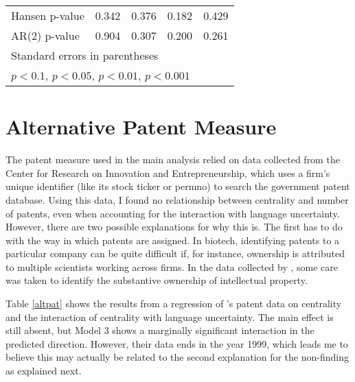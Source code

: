 \begin{table}
\begin{center}
{\begin{tabular}{l*{4}{c}}
Hansen p-value             &       0.342         &       0.376         &       0.182         &       0.429         \\
AR(2) p-value                &       0.904         &       0.307         &       0.200         &       0.261         \\
\hline\hline
\multicolumn{5}{l}{\footnotesize Standard errors in parentheses}\\
\multicolumn{5}{l}{\footnotesize \sym{+} \(p<0.1\), \sym{*} \(p<0.05\), \sym{**} \(p<0.01\), \sym{***} \(p<0.001\)}\\
\end{tabular}
}

\end{center}
\end{table}

\section{Alternative Patent Measure}

The patent measure used in the main analysis relied on data collected from the Center for Research on Innovation and Entrepreneurship, which uses a firm's unique identifier (like its stock ticker or permno) to search the government patent database. Using this data, I found no relationship between centrality and number of patents, even when accounting for the interaction with language uncertainty. However, there are two possible explanations for why this is. The first has to do with the way in which patents are assigned. In biotech, identifying patents to a particular company can be quite difficult if, for instance, ownership is attributed to multiple scientists working across firms. In the data collected by \citet{powell1999}, some care was taken to identify the substantive ownership of intellectual property.

Table \ref{altpat} shows the results from a regression of \citet{powell1999}'s patent data on centrality and the interaction of centrality with language uncertainty. The main effect is still absent, but Model 3 shows a marginally significant interaction in the predicted direction. However, their data ends in the year 1999, which leads me to believe this may actually be related to the second explanation for the non-finding as explained next.

